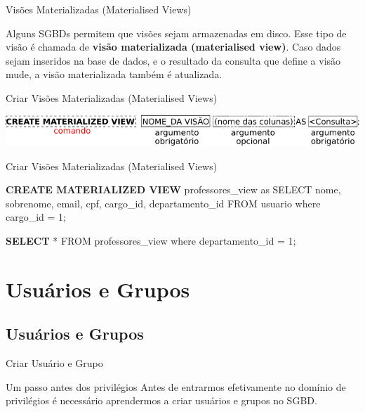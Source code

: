 \documentclass[xcolor=x11names,compress]{beamer}
\begin{document}
\begin{frame}{Visões Materializadas (Materialised Views)}

Alguns SGBDs permitem que visões sejam armazenadas em disco. Esse tipo de visão é chamada de \textbf{visão materializada (materialised view)}. Caso dados sejam inseridos na base de dados, e o resultado da consulta que define a visão mude, a visão materializada também é atualizada.

\end{frame}

\begin{frame}{Criar Visões Materializadas (Materialised Views)}

\centering \includegraphics[keepaspectratio,width=\textwidth]{create_materialised_view}

\end{frame}

\begin{frame}{Criar Visões Materializadas (Materialised Views)}

\begin{alertblock}{}
\textbf{CREATE MATERIALIZED VIEW} professores\_view as SELECT nome, sobrenome, email, cpf, cargo\_id, departamento\_id FROM usuario where cargo\_id = 1;
\end{alertblock}

\begin{alertblock}{}

\textbf{SELECT} * FROM professores\_view where departamento\_id = 1;

\end{alertblock}

\end{frame}

\section{Usuários e Grupos}
\subsection{Usuários e Grupos}

\begin{frame}{Criar Usuário e Grupo}

\begin{alertblock}{Um passo antes dos privilégios}
Antes de entrarmos efetivamente no domínio de privilégios é necessário aprendermos a criar usuários e grupos no SGBD.
\end{alertblock}

\end{frame}
\end{document}
